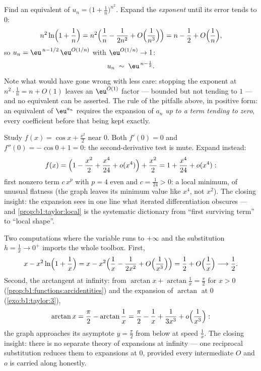 \begin{example}\label{ex:b1:taylor:expdiscipline}
Find an equivalent of $u_n = \bigl(1 + \frac1n\bigr)^{n^2}$.
Expand the \emph{exponent} until its error tends to $0$:
\[
n^2 \ln\Bigl(1 + \frac1n\Bigr)
= n^2\Bigl(\frac1n - \frac{1}{2n^2} +
O\Bigl(\frac{1}{n^3}\Bigr)\Bigr)
= n - \frac12 + O\Bigl(\frac1n\Bigr),
\]
so $u_n = \eu^{\,n - 1/2}\,\eu^{O(1/n)}$ with $\eu^{O(1/n)} \to
1$:
\[
u_n \;\sim\; \eu^{\,n - \frac12} .
\]
Note what would have gone wrong with less care: stopping the
exponent at $n^2\cdot\frac1n = n + O(1)$ leaves an
$\eu^{O(1)}$ factor --- bounded but not tending to $1$ --- and
no equivalent can be asserted. The rule of
the pitfalls above, in positive form: an equivalent of
$\eu^{a_n}$ requires the expansion of $a_n$ \emph{up to a term
tending to zero}, every coefficient before that being kept
exactly.
\end{example}

\begin{example}\label{ex:b1:taylor:flatmin}
Study $f(x) = \cos x + \frac{x^2}{2}$ near $0$. Both $f'(0) =
0$ and $f''(0) = -\cos 0 + 1 = 0$: the second-derivative test is
mute. Expand instead:
\[
f(x) = \Bigl(1 - \frac{x^2}{2} + \frac{x^4}{24} +
o(x^4)\Bigr) + \frac{x^2}{2}
= 1 + \frac{x^4}{24} + o(x^4) :
\]
first nonzero term $c\,x^p$ with $p = 4$ even and $c =
\frac{1}{24} > 0$: a local minimum, of unusual flatness (the
graph leaves its minimum value like $x^4$, not $x^2$). The
closing insight: the expansion sees in one line what iterated
differentiation obscures --- and \cref{prop:b1:taylor:local} is
the systematic dictionary from ``first surviving term'' to
``local shape''.
\end{example}

\begin{example}\label{ex:b1:taylor:atinfinity}
Two computations where the variable runs to $+\infty$ and the
substitution $h = \frac1x \to 0^+$ imports the whole toolbox.
First,
\[
x - x^2\ln\Bigl(1 + \frac1x\Bigr)
= x - x^2\Bigl(\frac1x - \frac{1}{2x^2} +
O\Bigl(\frac{1}{x^3}\Bigr)\Bigr)
= \frac12 + O\Bigl(\frac1x\Bigr) \longrightarrow \frac12 .
\]
Second, the arctangent at infinity: from $\arctan x +
\arctan\frac1x = \frac\pi2$ for $x > 0$
(\cref{prop:b1:functions:arcidentities}) and the expansion of
$\arctan$ at $0$ (\cref{exo:b1:taylor:3}),
\[
\arctan x = \frac\pi2 - \arctan\frac1x
= \frac\pi2 - \frac1x + \frac{1}{3x^3} +
o\Bigl(\frac{1}{x^3}\Bigr) :
\]
the graph approaches its asymptote $y = \frac\pi2$ from below at
speed $\frac1x$. The closing insight: there is no separate
theory of expansions at infinity --- one reciprocal substitution
reduces them to expansions at $0$, provided every intermediate
$O$ and $o$ is carried along honestly.
\end{example}

